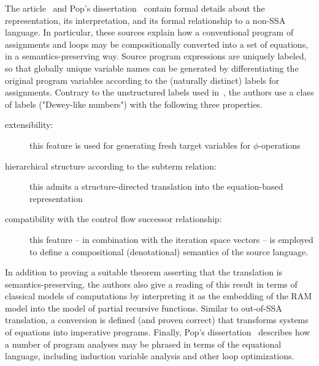 {The article~\cite{PopJS2007} and Pop's
dissertation~\cite{PopDissertation} contain formal details about the
representation, its interpretation, and its formal relationship to a
non-SSA language. In particular, these sources explain how a
conventional program of assignments and loops may be compositionally
converted into a set of equations, in a semantics-preserving
way. Source program expressions are uniquely labeled, so that globally
unique variable names can be generated by differentiating the original
program variables according to the (naturally distinct) labels for
assignments.  Contrary to the unstructured labels used
in~\cite{NielsonNielsonHanking:POPA}, the authors use a class of
labels ("Dewey-like numbers") with the following three properties.
\begin{description}
\item[extensibility:] this feature
is used for generating fresh target variables for $\phi$-operations
\item[hierarchical structure according to the subterm relation:]
   this admits a structure-directed translation into the
   equation-based representation
\item [compatibility with the control flow successor relationship:] 
  this feature -- in combination
with the iteration space vectors -- is employed to define a compositional
(denotational) semantics of the source language. 
\end{description}
In addition to proving a suitable theorem asserting that the
translation is semantics-preserving, the authors also give a reading
of this result in terms of classical models of computations by
interpreting it as the embedding of the RAM model into the model of
partial recursive functions. Similar to out-of-SSA translation, a
conversion is defined (and proven correct) that transforms systems of
equations into imperative programs. Finally, Pop's
dissertation~\cite{PopDissertation} describes how a number of program
analyses may be phrased in terms of the equational language, including
induction variable analysis and other loop optimizations.
}


%
%
